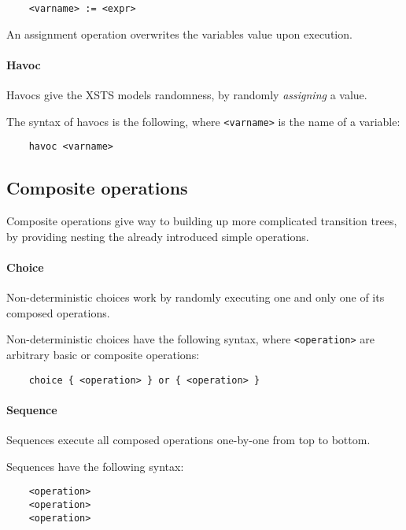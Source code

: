 \begin{Verbatim}
	<varname> := <expr>
\end{Verbatim}

An assignment operation overwrites the variables value upon execution.

\paragraph{Havoc}

Havocs give the XSTS models randomness, by randomly \emph{assigning} a value.

The syntax of havocs is the following, where \verb|<varname>| is the name of a variable:

\begin{Verbatim}
	havoc <varname>
\end{Verbatim}

\subsection{Composite operations}

Composite operations give way to building up more complicated transition trees, by providing nesting the already introduced simple operations.

\paragraph{Choice}

Non-deterministic choices work by randomly executing one and only one of its composed operations.

Non-deterministic choices have the following syntax, where \verb|<operation>| are arbitrary basic or composite operations:

\begin{Verbatim}
	choice { <operation> } or { <operation> }
\end{Verbatim}

\paragraph{Sequence}

Sequences execute all composed operations one-by-one from top to bottom.

Sequences have the following syntax:

\begin{Verbatim}
	<operation>
	<operation>
	<operation>
\end{Verbatim}

